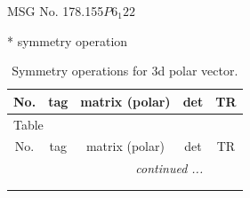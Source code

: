 \documentclass[fleqn,8pt]{jsarticle}
\begin{document}
\setcounter{MaxMatrixCols}{32}

\renewcommand{\tablename}{Table~}
\renewcommand{\figurename}{Figure~}
\begin{center}
\LARGE
MSG No. 178.155\quad$P6_{1}22$
\end{center}
* symmetry operation
\renewcommand{\arraystretch}{1.3}
\begin{longtable}{ccccc}
\caption{Symmetry operations for 3d polar vector.}
 \\
 \hline \hline
No. & tag & matrix (polar) & det & TR \\ \hline \endfirsthead

\multicolumn{4}{l}{\tablename\ \thetable{}} \\
 \hline \hline
No. & tag & matrix (polar) & det & TR \\ \hline \endhead

 \hline \hline
\multicolumn{4}{r}{\footnotesize\it continued ...} \\ \endfoot

 \hline \hline
\multicolumn{4}{r}{} \\ \endlastfoot


\end{longtable}
\end{document}
